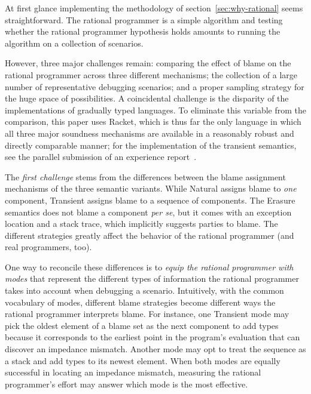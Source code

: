 
At first glance implementing the methodology of
section~\ref{sec:why-rational} seems straightforward. The rational
programmer is a simple algorithm and testing whether the rational
programmer hypothesis holds amounts to running the algorithm on a
collection of scenarios. 

However, three major challenges remain:  comparing the effect of
blame on the rational programmer across three different mechanisms; the
collection of a large number of representative debugging scenarios;  and a
proper sampling strategy for the huge space of possibilities. A
coincidental challenge is the disparity of the implementations of
gradually typed languages. To eliminate this variable from the comparison,
this paper uses Racket, which is thus far the only language in which all
three major soundness mechanisms are available in a reasonably robust and
directly comparable manner; for the implementation of the transient
semantics, see the parallel submission of an experience
report~\cite{ttt21}.

The {\em first challenge\/} stems from the differences between the blame
assignment mechanisms of the three semantic variants.  While Natural
assigns blame to {\em one\/} component, Transient assigns blame to a
sequence of components. The Erasure semantics does not blame a component
{\it per se\/}, but it comes with an exception location and a stack trace,
which implicitly suggests parties to blame.  The different strategies
greatly affect the behavior of the rational programmer (and real
programmers, too).

One way to reconcile these differences is to {\em equip the rational
programmer with modes \/} that represent the different types of
information the rational programmer takes into account when debugging a
scenario. Intuitively, with the common vocabulary of modes, different
blame strategies become different ways the rational programmer  interprets
blame.  For instance, one Transient mode may pick the oldest element of a
blame set as the next component to add types because it corresponds to the
earliest point in the program's evaluation that can discover an impedance
mismatch.  Another mode may opt to treat the sequence as a stack and add
types to its newest element.  When both modes are equally successful in
locating an impedance mismatch, measuring the rational programmer's effort
may answer which mode is the most effective.


